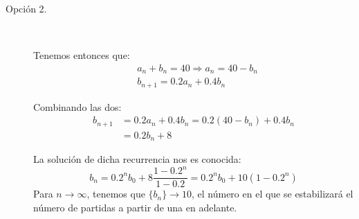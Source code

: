 \begin{ejercicio}
\begin{description}
        \item[Opción 2.]~
    
        Tenemos entonces que:
        \begin{align*}
            &a_n + b_n = 40 \Longrightarrow a_n = 40 - b_n\\
            &b_{n+1} = 0.2a_n + 0.4b_n
        \end{align*}
        
        Combinando las dos:
        \begin{align*}
            b_{n+1} &= 0.2a_n + 0.4b_n = 0.2(40-b_n) + 0.4b_n \\
            &= 0.2b_n + 8
        \end{align*}
        
        La solución de dicha recurrencia nos es conocida:
        \begin{equation*}
            b_n = 0.2^n b_0 + 8 \frac{1-0.2^n}{1-0.2} = 0.2^n b_0 + 10(1-0.2^n)
        \end{equation*}
        Para $n\to \infty$, tenemos que $\{b_n\}\to 10$, el número en el que se estabilizará el número de partidas a partir de una en adelante.
    \end{description}

    

    
\end{ejercicio}


